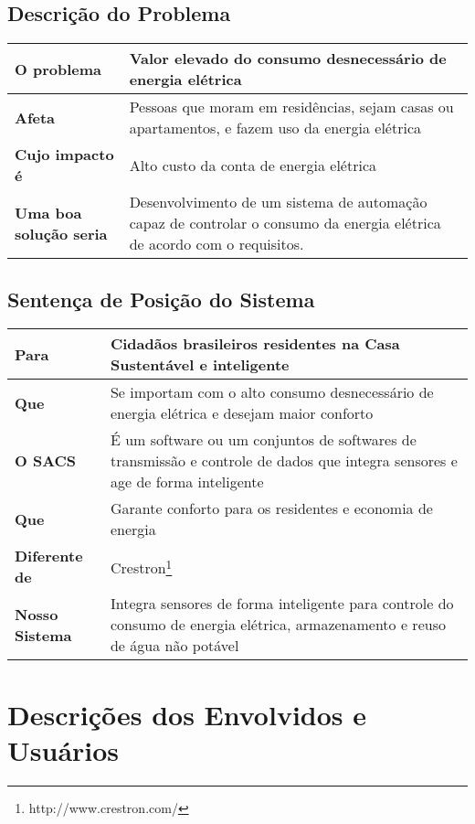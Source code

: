 \subsection{Descrição do Problema}

\begin{longtable}{|l|m{7cm}|}
	\hline \textbf{O problema} & Valor elevado do consumo desnecessário de energia elétrica\\
	\hline \textbf{Afeta} & Pessoas que moram em residências, sejam casas ou apartamentos, e fazem uso da energia elétrica\\
	\hline \textbf{Cujo impacto é} & Alto custo da conta de energia elétrica\\
	\hline \textbf{Uma boa solução seria} & Desenvolvimento de um sistema de automação capaz de controlar o consumo da energia elétrica de acordo com o requisitos.\\
	\hline
\end{longtable}

\subsection{Sentença de Posição do Sistema}

\begin{longtable}{|l|m{7cm}|}
	\hline \textbf{Para} & Cidadãos brasileiros residentes na Casa Sustentável e inteligente \\
	\hline \textbf{Que} & Se importam com o alto consumo desnecessário de energia elétrica e desejam maior conforto\\
	\hline \textbf{O SACS} & É um software ou um conjuntos de softwares de transmissão e controle de dados que integra sensores e age de forma inteligente\\
	\hline \textbf{Que} & Garante conforto para os residentes e economia de energia\\
	\hline \textbf{Diferente de} & Crestron\footnote{http://www.crestron.com/}\\
	\hline \textbf{Nosso Sistema} & Integra sensores de forma inteligente para controle do consumo de energia elétrica, armazenamento e reuso de água não potável\\
	\hline
\end{longtable}

\section{Descrições dos Envolvidos e Usuários}

